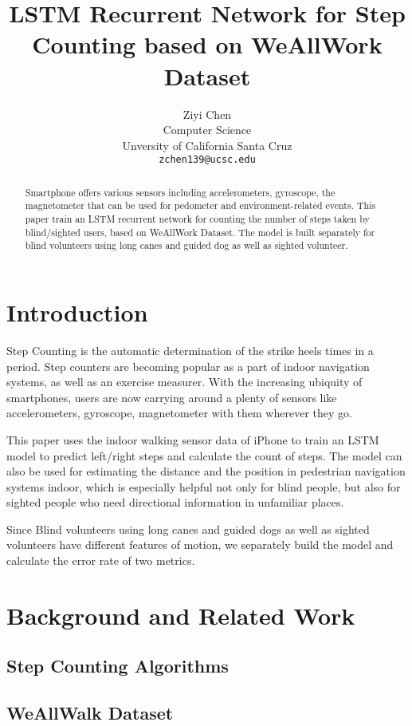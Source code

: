 \documentclass[11pt]{article}
\title{LSTM Recurrent Network for Step Counting based on WeAllWork Dataset}
\author{Ziyi Chen \\
  Computer Science  \\
  Unversity of California Santa Cruz\\
  {\tt zchen139@ucsc.edu}}
\date{}
\begin{document}
\maketitle
\begin{abstract}

Smartphone offers various sensors including accelerometers, gyroscope, the magnetometer that can be used for pedometer and environment-related events. This paper train an LSTM recurrent network for counting the number of steps taken by blind/sighted users, based on WeAllWork Dataset. The model is built separately for blind volunteers using long canes and guided dog as well as sighted volunteer.

\end{abstract}

\section{Introduction}

Step Counting is the automatic determination of the strike heels times in a period. Step counters are becoming popular as a part of indoor navigation systems, as well as an exercise measurer. With the increasing ubiquity of smartphones, users are now carrying around a plenty of sensors like accelerometers, gyroscope, magnetometer with them wherever they go. 

This paper uses the indoor walking sensor data of iPhone to train an LSTM model to predict left/right steps and calculate the count of steps. The model can also be used for estimating the distance and the position in pedestrian navigation systems indoor, which is especially helpful not only for blind people, but also for sighted people who need directional information in unfamiliar places.

Since Blind volunteers using long canes and guided dogs as well as sighted volunteers have different features of motion, we separately build the model and calculate the error rate of two metrics.



\section{Background and Related Work}
\subsection{Step Counting Algorithms}
\subsection{WeAllWalk Dataset}
\end{document}
